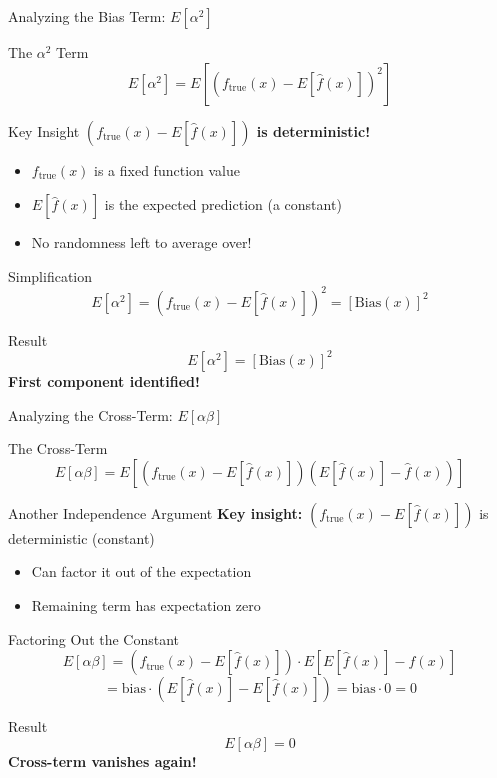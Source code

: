 \documentclass[10pt]{beamer}
\begin{document}
\begin{frame}{Analyzing the Bias Term: $E[\alpha^2]$}
\begin{definitionbox}{The $\alpha^2$ Term}
$$E[\alpha^2] = E[(f_{\text{true}}(x) - E[\hat{f}(x)])^2]$$
\end{definitionbox}

\begin{keypointsbox}{Key Insight}
\textbf{$(f_{\text{true}}(x) - E[\hat{f}(x)])$ is deterministic!}
\begin{itemize}
\item $f_{\text{true}}(x)$ is a fixed function value
\item $E[\hat{f}(x)]$ is the expected prediction (a constant)
\item No randomness left to average over!
\end{itemize}
\end{keypointsbox}

\begin{examplebox}{Simplification}
$$E[\alpha^2] = (f_{\text{true}}(x) - E[\hat{f}(x)])^2 = [\text{Bias}(x)]^2$$
\end{examplebox}

\begin{alertbox}{Result}
$$\boxed{E[\alpha^2] = [\text{Bias}(x)]^2}$$
\textbf{First component identified!}
\end{alertbox}
\end{frame}

\begin{frame}{Analyzing the Cross-Term: $E[\alpha\beta]$}
\begin{definitionbox}{The Cross-Term}
$$E[\alpha\beta] = E[(f_{\text{true}}(x) - E[\hat{f}(x)])(E[\hat{f}(x)] - \hat{f}(x))]$$
\end{definitionbox}

\begin{keypointsbox}{Another Independence Argument}
\textbf{Key insight:} $(f_{\text{true}}(x) - E[\hat{f}(x)])$ is deterministic (constant)
\begin{itemize}
\item Can factor it out of the expectation
\item Remaining term has expectation zero
\end{itemize}
\end{keypointsbox}

\begin{examplebox}{Factoring Out the Constant}
$$E[\alpha\beta] = (f_{\text{true}}(x) - E[\hat{f}(x)]) \cdot E[E[\hat{f}(x)] - \hat{f}(x)]$$
$$= \text{bias} \cdot (E[\hat{f}(x)] - E[\hat{f}(x)]) = \text{bias} \cdot 0 = 0$$
\end{examplebox}

\begin{alertbox}{Result}
$$\boxed{E[\alpha\beta] = 0}$$
\textbf{Cross-term vanishes again!}
\end{alertbox}
\end{frame}
\end{document}
